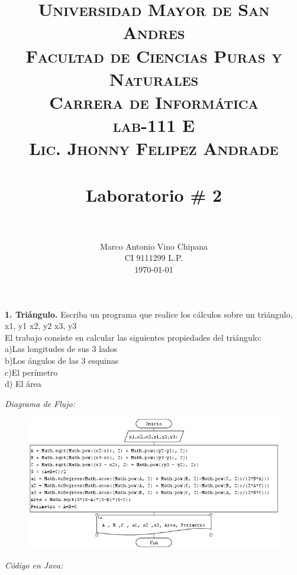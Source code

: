\documentclass[12pt]{article}
\title{
		\usefont{OT1}{bch}{b}{n}
		\normalfont \normalsize \textsc{Universidad Mayor de San Andres \\
        Facultad de Ciencias Puras y Naturales\\
        Carrera de Informática \\
        lab-111 E \\
        Lic. Jhonny Felipez Andrade} \\ [25pt]
		\horrule{0.5pt} \\[0.2cm]
		\huge Laboratorio \# 2 \\
       \horrule{2pt} \\[0.1cm]
}
\author{
		\normalfont 								\normalsize
        Marco Antonio Vino Chipana	 \\
        CI 9111299 L.P.\\[-3pt]		\normalsize
        \today
}
\date{}
\begin{document}
 
\maketitle 
\thispagestyle{empty}

\newpage

\textbf{1. Triángulo.} Escriba un programa que realice los cálculos sobre un triángulo,
x1, y1 
x2, y2 
x3, y3 \\
El trabajo consiste en calcular las siguientes propiedades del triángulo:\\
a)Las longitudes de sus 3 lados\\
b)Los ángulos de las 3 esquinas\\
c)El perímetro\\
d) El área 


\textit{Diagrama de Flujo:  }
\begin{figure}[h!]
\centering
	\includegraphics[scale=0.65]{dicor/Triangulo.png}    
\end{figure}

\textit{Código en Java:}

\newpage
\end{document}
